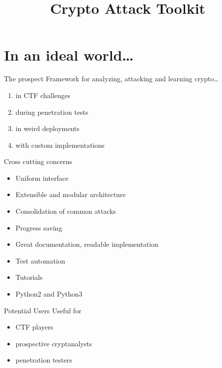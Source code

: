 \documentclass[10pt,aspectratio=169,table,usenames,dvipsnames,table]{beamer}
\title{Crypto Attack Toolkit}
\author{}
\institute{Industrial Software}
\begin{document}

\maketitle

\section{In an ideal world\ldots}

\begin{frame}{The prospect}
  Framework for analyzing, attacking and learning crypto\ldots
  \begin{enumerate}
    \item in CTF challenges
    \item during penetration tests
    \item in weird deployments
    \item with custom implementations
  \end{enumerate}
\end{frame}

\begin{frame}{Cross cutting concerns}
  \begin{itemize}
    \item Uniform interface
    \item Extensible and modular architecture
    \vspace{1em}
    \item Consolidation of common attacks
    \item Progress saving
    \vspace{1em}
    \item Great documentation, readable implementation
    \item Test automation
    \item Tutorials
    \vspace{1em}
    \item Python2 and Python3
  \end{itemize}
\end{frame}

\begin{frame}{Potential Users}
  Useful for
  \begin{itemize}
    \item CTF players
    \item prospective cryptanalysts
    \item penetration testers
  \end{itemize}
\end{frame}
\end{document}
